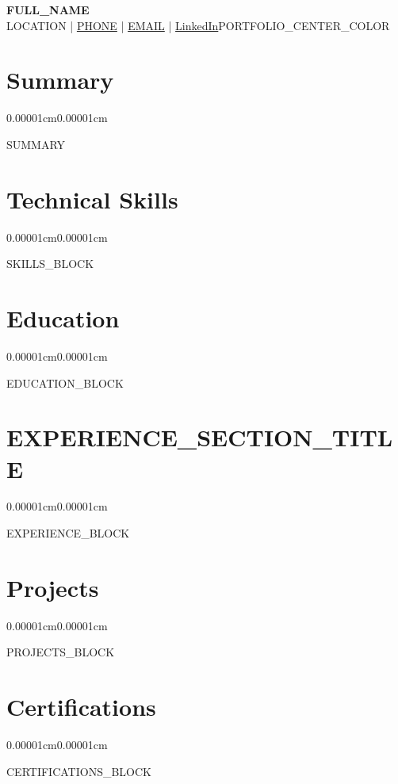\documentclass[10pt, letterpaper]{article}
\newenvironment{highlightsforbulletentries}{
    \begin{itemize}[topsep=0.05cm, parsep=0.05cm, partopsep=0pt, itemsep=0pt, leftmargin=10pt]
}{\end{itemize}}
\newenvironment{onecolentry}{
    \begin{adjustwidth}{0.00001cm}{0.00001cm}
}{\end{adjustwidth}}
\let\hrefWithoutArrow\href
\begin{document}
    {\centering
        {\fontsize{24pt}{24pt}\selectfont\textbf{\textcolor{accentColor}{{{FULL_NAME}}}}}\\[4pt]
        \normalsize
        {{LOCATION}} \quad\textcolor{accentColor}{|}\quad
        \hrefWithoutArrow{tel:{{PHONE_RAW}}}{{{PHONE}}} \quad\textcolor{accentColor}{|}\quad
        \hrefWithoutArrow{mailto:{{EMAIL}}}{{{EMAIL}}} \quad\textcolor{accentColor}{|}\quad
        \hrefWithoutArrow{{{LINKEDIN_URL}}}{LinkedIn}{{PORTFOLIO_CENTER_COLOR}}
    \par}
    \vspace{6pt}

    \section{Summary}
    \begin{onecolentry}
        {{SUMMARY}}
    \end{onecolentry}

    \section{Technical Skills}
    \begin{onecolentry}
        {{SKILLS_BLOCK}}
    \end{onecolentry}

    \section{Education}
    \begin{onecolentry}
        {{EDUCATION_BLOCK}}
    \end{onecolentry}

    \section{{{EXPERIENCE_SECTION_TITLE}}}
    \begin{onecolentry}
        {{EXPERIENCE_BLOCK}}
    \end{onecolentry}

    \section{Projects}
    \begin{onecolentry}
        {{PROJECTS_BLOCK}}
    \end{onecolentry}

    \section{Certifications}
    \begin{onecolentry}
        \begin{highlightsforbulletentries}
            {{CERTIFICATIONS_BLOCK}}
        \end{highlightsforbulletentries}
    \end{onecolentry}
\end{document}
